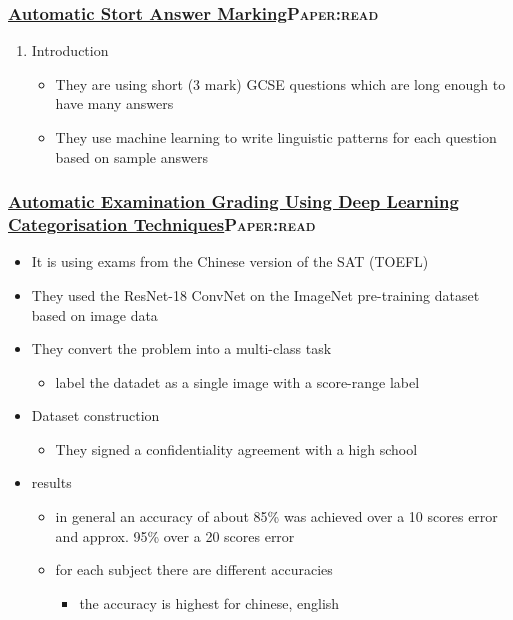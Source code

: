 \documentclass[11pt]{article}
\begin{document}
\subsubsection{\href{./cs/Automatic\_Short\_Answer\_marking.pdf}{Automatic Stort Answer Marking}\hfill{}\textsc{Paper:read}}
\label{sec:org4502285}
\begin{enumerate}
\item Introduction
\label{sec:org99e2358}
\begin{itemize}
\item They are using short (3 mark) GCSE questions which are long enough to have many answers
\item They use machine learning to write linguistic patterns for each question based on sample answers
\end{itemize}
\end{enumerate}
\subsubsection{\href{./cs/AutomatedExaminationGradingUsingDeepLearningCategorizationTechniques.pdf}{Automatic Examination Grading Using Deep Learning Categorisation Techniques}\hfill{}\textsc{Paper:read}}
\label{sec:org1a00d08}
\begin{itemize}
\item It is using exams from the Chinese version of the SAT (TOEFL)
\item They used the ResNet-18 ConvNet on the ImageNet pre-training dataset based on image data
\item They convert the problem into a multi-class task
\begin{itemize}
\item label the datadet as a single image with a score-range label
\end{itemize}
\item Dataset construction
\begin{itemize}
\item They signed a confidentiality agreement with a high school
\end{itemize}
\item results
\begin{itemize}
\item in general an accuracy of about 85\% was achieved over a 10 scores error and approx. 95\% over a 20 scores error
\item for each subject there are different accuracies
\begin{itemize}
\item the accuracy is highest for chinese, english
\end{itemize}
\end{itemize}
\end{itemize}
\end{document}
